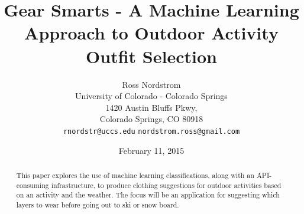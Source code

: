 \documentclass{sig-alternate}
\begin{document}
\title{Gear Smarts - A Machine Learning Approach to Outdoor Activity Outfit Selection}
\author{Ross Nordstrom\\
        University of Colorado - Colorado Springs\\
        1420 Austin Bluffs Pkwy,\\
        Colorado Springs, CO 80918\\
        \texttt{rnordstr@uccs.edu}
        \texttt{nordstrom.ross@gmail.com}
       }
\date{February 11, 2015}

\maketitle

\begin{abstract}
This paper explores the use of machine learning classifications, along with an API-consuming infrastructure, to
produce clothing suggestions for outdoor activities based on an activity and the weather. The focus will be an
application for suggesting which layers to wear before going out to ski or snow board.
\end{abstract}







% 
% 
% 

{}

\end{document}
